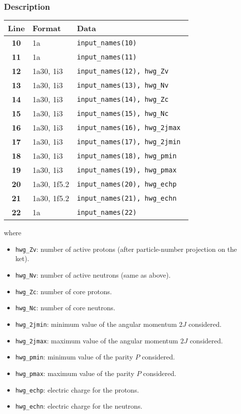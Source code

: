 \documentclass[a4paper,11pt]{article}
\newcommand{\ttt}[1]{\texttt{#1}}
\begin{document}
\subsubsection*{Description}
\begin{center}
\begin{tabular}{|c|l|l|}
\hline
Line & Format & Data \\
\hline
 \textbf{10}   & 1a           & \tt input\_names(10)              \\
 \textbf{11}   & 1a           & \tt input\_names(11)              \\
 \textbf{12}   & 1a30, 1i3    & \tt input\_names(12), hwg\_Zv     \\
 \textbf{13}   & 1a30, 1i3    & \tt input\_names(13), hwg\_Nv     \\
 \textbf{14}   & 1a30, 1i3    & \tt input\_names(14), hwg\_Zc     \\
 \textbf{15}   & 1a30, 1i3    & \tt input\_names(15), hwg\_Nc     \\
 \textbf{16}   & 1a30, 1i3    & \tt input\_names(16), hwg\_2jmax  \\
 \textbf{17}   & 1a30, 1i3    & \tt input\_names(17), hwg\_2jmin  \\
 \textbf{18}   & 1a30, 1i3    & \tt input\_names(18), hwg\_pmin   \\
 \textbf{19}   & 1a30, 1i3    & \tt input\_names(19), hwg\_pmax   \\
 \textbf{20}   & 1a30, 1f5.2  & \tt input\_names(20), hwg\_echp   \\
 \textbf{21}   & 1a30, 1f5.2  & \tt input\_names(21), hwg\_echn   \\
 \textbf{22}   & 1a           & \tt input\_names(22)              \\
\hline
\end{tabular}
\end{center}
where
\begin{itemize}
 \item \ttt{hwg\_Zv}: number of active protons (after particle-number projection on the ket).
 \item \ttt{hwg\_Nv}: number of active neutrons (same as above). 
 \item \ttt{hwg\_Zc}: number of core protons.
 \item \ttt{hwg\_Nc}: number of core neutrons. 
 \item \ttt{hwg\_2jmin}: minimum value of the angular momentum $2J$ considered.
 \item \ttt{hwg\_2jmax}: maximum value of the angular momentum $2J$ considered.
 \item \ttt{hwg\_pmin}: minimum value of the parity $P$ considered.
 \item \ttt{hwg\_pmax}: maximum value of the parity $P$ considered.
 \item \ttt{hwg\_echp}: electric charge for the protons.              
 \item \ttt{hwg\_echn}: electric charge for the neutrons.             
\end{itemize}
\end{document}
